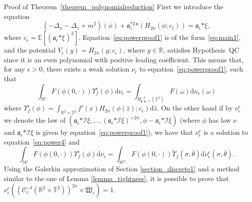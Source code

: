 \documentclass[a4paper,10pt]{article}
\newcommand{\asterisk}{\mathord{*}}
\newcommand{\mathd}{\mathrm{d}}
\newenvironment{proof*}[1]{\noindent\textbf{#1\ }}{\hspace*{\fill}$\Box$\medskip}
\begin{document}
\begin{proof*}{Proof of Theorem~\ref{theorem_polynomialreduction}}
  First we introduce the equation
  \begin{equation}
    (- \Delta_x - \Delta_z + m^2) (\phi) +
    \mathfrak{a}_{\varepsilon}^{\asterisk 2} \asterisk (H_{2 n} (\phi ;
    c_{\epsilon})) = \mathfrak{a}_{\epsilon} \asterisk \xi_{}
    \label{eq:powerproof1},
  \end{equation}
  where $c_{\epsilon} =\mathbb{E} [(\mathfrak{a}_{\epsilon} \asterisk
  \xi_{})^2]$. Equation~{\eqref{eq:powerproof1}} is of the
  form~{\eqref{eq:main1}}, and the potential $V_{\epsilon} (y) = H_{2 n} (y ;
  c_{\epsilon})$, where $y \in \mathbb{R}$, satisfies Hypothesis~QC since it
  is an even polynomial with positive leading coefficient. This means that,
  for any $\epsilon > 0$, there exists a weak solution $\nu_{\epsilon}$ to
  equation~{\eqref{eq:powerproof1}}, such that
  \[ \int_{\mathcal{W}} F (\phi (0, \cdot)) \Upsilon_f^{\epsilon} (\phi)
     \mathd \nu_{\epsilon} = \int_{B^{- \delta}_{\mathfrak{p}, \mathfrak{p},
     \ell} (\mathbb{T}^2)} F (\omega) \mathd \kappa_{\epsilon} (\omega) \]
  where $\Upsilon_f^{\epsilon} (\phi) = \int_{\mathbb{R}^2 \times
  \mathbb{T}^2} f' (x) H_{2 n} (\phi (\hat{z}) ; c_{\epsilon}) \mathd
  \hat{z}$. On the other hand if by $\nu^e_{\epsilon}$ we denote the law of
  $(\mathcal{\mathfrak{a}}_{\epsilon} \asterisk \mathcal{I} \xi, \ldots,
  (\mathcal{\mathfrak{a}}_{\epsilon} \asterisk \mathcal{I} \xi)^{\diamond 2
  n}, \phi - \mathcal{\mathfrak{a}}_{\epsilon} \asterisk \mathcal{I} \xi)$
  (where $\phi$ has law $\nu$ and $\mathcal{\mathfrak{a}}_{\epsilon} \asterisk
  \mathcal{I} \xi$ is given by equation~{\eqref{eq:powerproof1}}), we have
  that $\nu^e_{\epsilon}$ is a solution to equation~{\eqref{eq:power4}} and
  \[ \int_{\mathcal{W}} F (\phi (0, \cdot)) \Upsilon_f^{\epsilon} (\phi)
     \mathd \nu_{\epsilon} = \int_{\mathcal{W}^e} F (\phi (0, \cdot))
     \tilde{\Upsilon}_f (\sigma, \bar{\theta}) \mathd \nu^e_{\epsilon}
     (\sigma, \bar{\theta}) . \]
  Using the Galerkin approximation of Section \ref{section_discrete1} and a
  method similar to the one of Lemma \ref{lemma_tightness}, it is possible to
  prove that $\nu^e_{\epsilon} ((\mathcal{C}^{- \delta}_{\ell} (\mathbb{R}^2
  \times \mathbb{T}^2))^{2 n} \times \overline{\mathfrak{W}}_{\varepsilon}) =
  1$.
  

\end{proof*}
\end{document}
